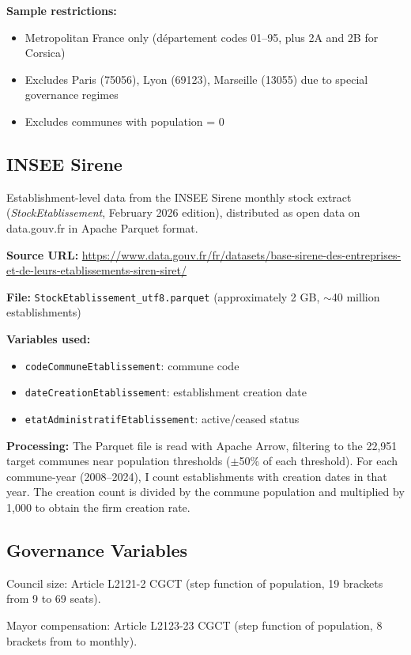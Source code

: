 \documentclass[12pt]{article}
\begin{document}
\textbf{Sample restrictions:}
\begin{itemize}
\item Metropolitan France only (d\'{e}partement codes 01--95, plus 2A and 2B for Corsica)
\item Excludes Paris (75056), Lyon (69123), Marseille (13055) due to special governance regimes
\item Excludes communes with population = 0
\end{itemize}

\subsection{INSEE Sirene}

Establishment-level data from the INSEE Sirene monthly stock extract (\textit{StockEtablissement}, February 2026 edition), distributed as open data on data.gouv.fr in Apache Parquet format.

\textbf{Source URL:} \url{https://www.data.gouv.fr/fr/datasets/base-sirene-des-entreprises-et-de-leurs-etablissements-siren-siret/}

\textbf{File:} \texttt{StockEtablissement\_utf8.parquet} (approximately 2 GB, $\sim$40 million establishments)

\textbf{Variables used:}
\begin{itemize}
\item \texttt{codeCommuneEtablissement}: commune code
\item \texttt{dateCreationEtablissement}: establishment creation date
\item \texttt{etatAdministratifEtablissement}: active/ceased status
\end{itemize}

\textbf{Processing:} The Parquet file is read with Apache Arrow, filtering to the 22,951 target communes near population thresholds ($\pm$50\% of each threshold). For each commune-year (2008--2024), I count establishments with creation dates in that year. The creation count is divided by the commune population and multiplied by 1,000 to obtain the firm creation rate.

\subsection{Governance Variables}

Council size: Article L2121-2 CGCT (step function of population, 19 brackets from 9 to 69 seats).

Mayor compensation: Article L2123-23 CGCT (step function of population, 8 brackets from  to  monthly).
\end{document}
